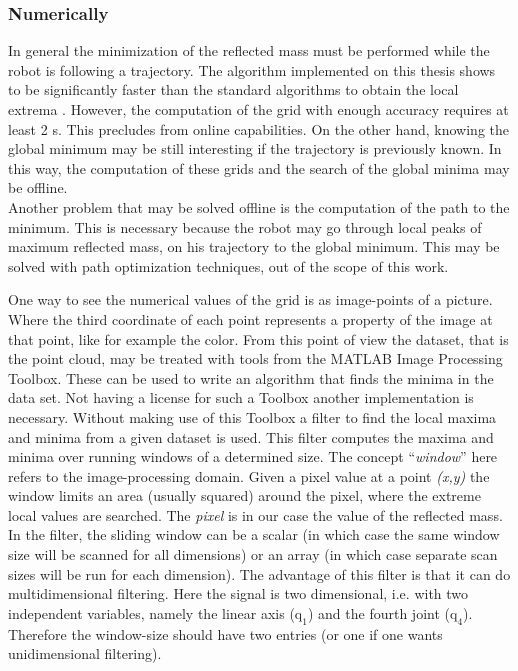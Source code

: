 \subsubsection{Numerically}
\label{sec:global_numerical}


In general the minimization of the reflected mass must be performed while the robot is following a trajectory. The algorithm  implemented on this thesis shows to be significantly faster than the standard algorithms to obtain the local extrema \cite{Lemire}. However, the computation of the grid with enough accuracy requires at least 2 s.  This precludes from online capabilities.  On the other hand, knowing the global minimum may be still interesting if the trajectory is previously known. In this way, the computation of these grids and the search of the global minima may be offline.\\
%
Another problem that may be solved offline is the computation of the path to the minimum. This is necessary because the robot may go through local peaks of maximum reflected mass, on his trajectory to the global minimum. This may be solved with path optimization techniques, out of the scope of this work. 

%
One way to see the numerical values of the grid is as image-points of a picture. Where the third coordinate of each point represents a property of the image at that point, like for example the color. From this point of view the dataset, that is the point cloud, may be treated with tools from the MATLAB Image Processing Toolbox. These can be used to write an algorithm that finds the minima in the data set. Not having a license for such a Toolbox another implementation is necessary.
Without making use of this Toolbox a filter \cite{minmaxfilter} to find the local maxima and minima from a given dataset is used. This filter computes the maxima and minima over running windows of a determined size. The concept “\textit{window}” here refers to the image-processing domain. Given a pixel value at a point \textit{(x,y)} the window limits an area (usually squared) around the pixel, where the extreme local values are searched. The \textit{pixel} is in our case  the value of the reflected mass.\\
%
In the filter, the sliding window can be a scalar (in which case the same window size will be scanned for all dimensions) or an array (in which case separate scan sizes will be run for each dimension). The advantage of this filter is that it can do multidimensional filtering. Here the signal is two dimensional, i.e. with two independent variables, namely the linear axis ($\mathrm{q_1}$) and the fourth joint ($\mathrm{q_4}$). Therefore the window-size should have two entries (or one if one wants unidimensional filtering).


